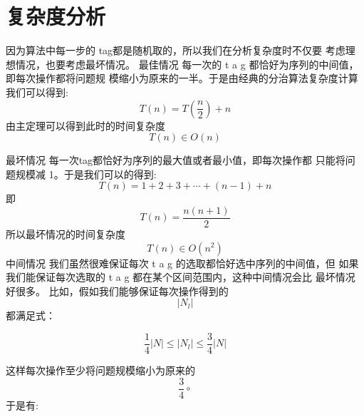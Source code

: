\section{复杂度分析}
因为算法中每一步的 tag都是随机取的，所以我们在分析复杂度时不仅要 考虑理想情况，也要考虑最坏情况。
最佳情况  \quad  每一次的  t a g  都恰好为序列的中间值，即每次操作都将问题规 模缩小为原来的一半。于是由经典的分治算法复杂度计算我们可以得到:
$$T(n)=T\left(\frac{n}{2}\right)+n$$
由主定理可以得到此时的时间复杂度
$$T(n) \in O(n)$$

最坏情况 每一次tag都恰好为序列的最大值或者最小值，即每次操作都 只能将问题规模减 1。于是我们可以的得到:
$$
T(n)=1+2+3+\cdots+(n-1)+n
$$
即
$$
T(n)=\frac{n(n+1)}{2}
$$
所以最坏情况的时间复杂度
$$
T(n) \in O\left(n^{2}\right)
$$
中间情况  \quad  我们虽然很难保证每次  t a g  的选取都恰好选中序列的中间值，但
如果我们能保证每次选取的  t a g  都在某个区间范围内，这种中间情况会比 最坏情况好很多。
比如，假如我们能够保证每次操作得到的  
$$\left|N_{l}\right|  $$
都满足式：

$$\frac{1}{4}|N| \leq\left|N_{l}\right| \leq \frac{3}{4}|N|$$

这样每次操作至少将问题规模缩小为原来的  $$\frac{3}{4} \circ $$ 于是有:
